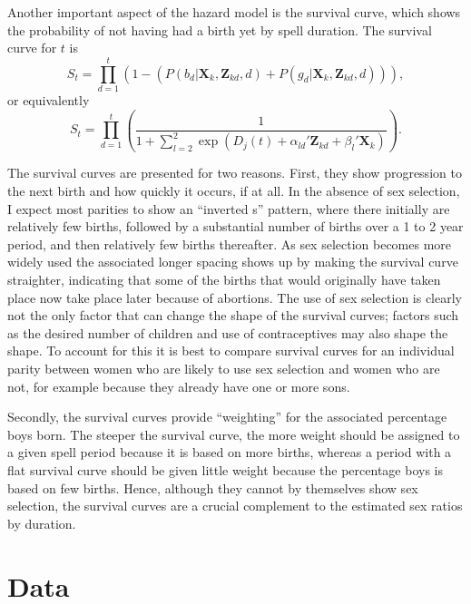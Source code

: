 \documentclass[12pt,letterpaper]{article}
\begin{document}
Another important aspect of the hazard model is the survival curve, which shows the 
probability of not having had a birth yet by spell duration.
The survival curve for $t$ is 
\begin{equation}
S_{t} 
= 
\prod_{d=1}^t 
\left( 
	1- \left(P(b_{d} | \mathbf{X}_{k}, \mathbf{Z}_{kd}, d) 
	+ P(g_{d} | \mathbf{X}_{k}, \mathbf{Z}_{kd}, d) \right) 
\right),
 \label{eq:survival}
\end{equation}
or equivalently
\begin{equation}
S_{t} 
= 
\prod_{d=1}^t
\left(
\frac{ 1 }
{1 + \sum_{l=2}^2 \exp(D_j(t) + \alpha_{ld}'\mathbf{Z}_{kd} + \beta_l'\mathbf{X}_{k})}
\right).
\end{equation}

The survival curves are presented for two reasons.
First, they show progression to the next birth and how quickly 
it occurs, if at all.
In the absence of sex selection, I expect most parities to show an 
``inverted s'' pattern, where there initially are relatively few births, 
followed by a substantial number of births over a 1 to 2 year period, and then
relatively few births thereafter.
As sex selection becomes more widely used the associated
longer spacing shows up by making the survival curve straighter,
indicating that some of the births that would originally have taken place
now take place later because of abortions.
The use of sex selection is clearly not the only factor that can change the shape of
the survival curves; factors such as the desired number of children and
use of contraceptives may also shape the shape.
To account for this it is best to compare survival curves for an individual
parity between women who are likely to use sex selection and women who are
not, for example because they already have one or more sons.

Secondly, the survival curves provide ``weighting'' for the associated percentage 
boys born.
The steeper the survival curve, the more weight should be assigned to a given
spell period because it is based on more births, 
whereas a period with a flat survival curve should be given little weight because the 
percentage boys is based on few births.
Hence, although they cannot by themselves show sex selection, the survival
curves are a crucial complement to the estimated sex ratios by duration.


\section{Data\label{sec:data}}
\end{document}
